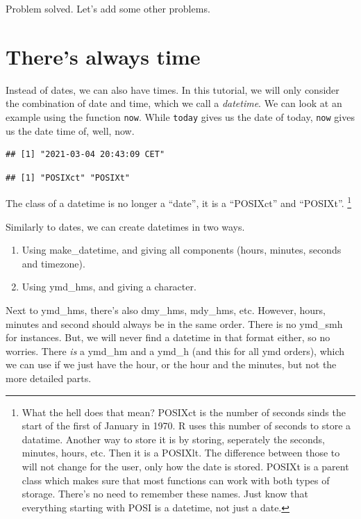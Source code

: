 \documentclass[]{tufte-book}
\providecommand{\tightlist}{%
  \setlength{\itemsep}{0pt}\setlength{\parskip}{0pt}}
\begin{document}
Problem solved. Let's add some other problems.

\hypertarget{theres-always-time}{%
\section{There's always time}\label{theres-always-time}}

Instead of dates, we can also have times. In this tutorial, we will only consider the combination of date and time, which we call a \emph{datetime}. We can look at an example using the function \texttt{now}. While \texttt{today} gives us the date of today, \texttt{now} gives us the date time of, well, now.

\begin{verbatim}
## [1] "2021-03-04 20:43:09 CET"
\end{verbatim}

\begin{verbatim}
## [1] "POSIXct" "POSIXt"
\end{verbatim}

The class of a datetime is no longer a ``date'', it is a ``POSIXct'' and ``POSIXt''. \footnote{What the hell does that mean? POSIXct is the number of seconds sinds the start of the first of January in 1970. R uses this number of seconds to store a datatime. Another way to store it is by storing, seperately the seconds, minutes, hours, etc. Then it is a POSIXlt. The difference between those to will not change for the user, only how the date is stored. POSIXt is a parent class which makes sure that most functions can work with both types of storage. There's no need to remember these names. Just know that everything starting with POSI is a datetime, not just a date.}

Similarly to dates, we can create datetimes in two ways.

\begin{enumerate}
\def\labelenumi{\arabic{enumi}.}
\tightlist
\item
  Using make\_datetime, and giving all components (hours, minutes, seconds and timezone).
\item
  Using ymd\_hms, and giving a character.
\end{enumerate}

Next to ymd\_hms, there's also dmy\_hms, mdy\_hms, etc. However, hours, minutes and second should always be in the same order. There is no ymd\_smh for instances. But, we will never find a datetime in that format either, so no worries. There \emph{is} a ymd\_hm and a ymd\_h (and this for all ymd orders), which we can use if we just have the hour, or the hour and the minutes, but not the more detailed parts.
\end{document}
